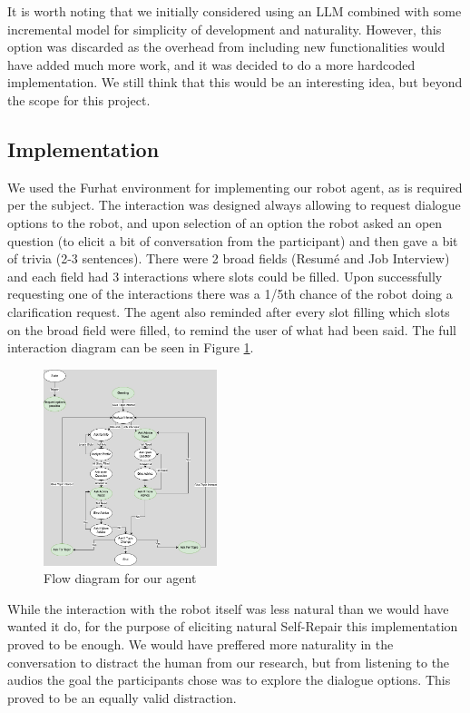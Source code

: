 \documentclass[11pt]{article}
\begin{document}
It is worth noting that we initially considered using an LLM combined with some incremental model \cite{schlangen2011general} for simplicity of development and naturality. However, this option was discarded as the overhead from including new functionalities would have added much more work, and it was decided to do a more hardcoded implementation. We still think that this would be an interesting idea, but beyond the scope for this project.

\subsection{Implementation}

We used the Furhat environment for implementing our robot agent, as is required per the subject. The interaction was designed always allowing to request dialogue options to the robot, and upon selection of an option the robot asked an open question (to elicit a bit of conversation from the participant) and then gave a bit of trivia (2-3 sentences). There were 2 broad fields (Resumé and Job Interview) and each field had 3 interactions where slots could be filled. Upon successfully requesting one of the interactions there was a 1/5th chance of the robot doing a clarification request. The agent also reminded after every slot filling which slots on the broad field were filled, to remind the user of what had been said. The full interaction diagram can be seen in Figure \ref{flow_diagram}.


\begin{figure}[h]
	
	\centering
	\includegraphics[width=0.45\textwidth]{flow_diagram}
	\caption{Flow diagram for our agent}
	\label{flow_diagram}
\end{figure}

While the interaction with the robot itself was less natural than we would have wanted it do, for the purpose of eliciting natural Self-Repair this implementation proved to be enough. We would have preffered more naturality in the conversation to distract the human from our research, but from listening to the audios the goal the participants chose was  to explore the dialogue options. This proved to be an equally valid distraction.
\end{document}

